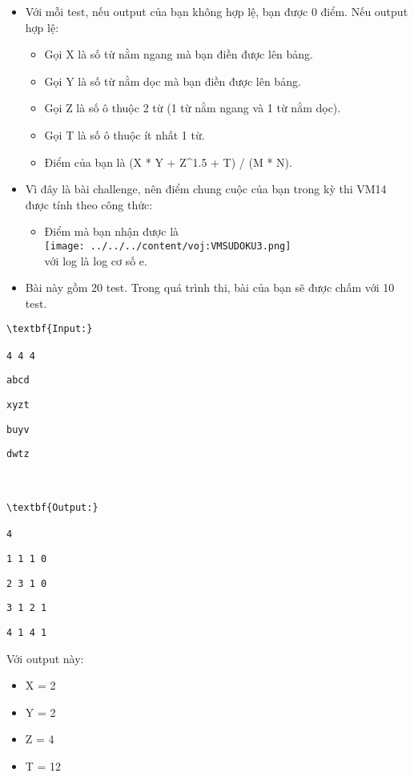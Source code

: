 \begin{itemize}
	\item Với mỗi test, nếu output của bạn không hợp lệ, bạn được 0 điểm. Nếu output hợp lệ:              

 
\begin{itemize}
	\item Gọi X là số từ nằm ngang mà bạn điền được lên bảng.
	\item Gọi Y là số từ nằm dọc mà bạn điền được lên bảng.
	\item Gọi Z là số ô thuộc 2 từ (1 từ nằm ngang và 1 từ nằm dọc).
	\item Gọi T là số ô thuộc ít nhất 1 từ.
	\item Điểm của bạn là (X * Y + Z\textasciicircum1.5 + T) / (M * N).
\end{itemize}
	\item Vì đây là bài challenge, nên điểm chung cuộc của bạn trong kỳ thi VM14 được tính theo công thức:                        


\begin{itemize}
item Giả sử bạn đứng thứ i trong bảng xếp hạng của bài (nghĩa là có i-1 người điểm cao hơn bạn).
	\item Điểm mà bạn nhận được là  
\\
\texttt{[image: ../../../content/voj:VMSUDOKU3.png]}
\\ với log là log cơ số e.
\end{itemize}
	\item Bài này gồm 20 test. Trong quá trình thi, bài của bạn sẽ được chấm với 10 test.                 

 
\begin{itemize}
\end{itemize}
\end{itemize}
\begin{verbatim}
\textbf{Input:}

4 4 4\end{verbatim}
\begin{verbatim}
abcd\end{verbatim}
\begin{verbatim}
xyzt\end{verbatim}
\begin{verbatim}
buyv\end{verbatim}
\begin{verbatim}
dwtz



\textbf{Output:}

4\end{verbatim}
\begin{verbatim}
1 1 1 0\end{verbatim}
\begin{verbatim}
2 3 1 0\end{verbatim}
\begin{verbatim}
3 1 2 1\end{verbatim}
\begin{verbatim}
4 1 4 1\end{verbatim}

Với output này:
\begin{itemize}
	\item X = 2
	\item Y = 2
	\item Z = 4
	\item T = 12
\end{itemize}